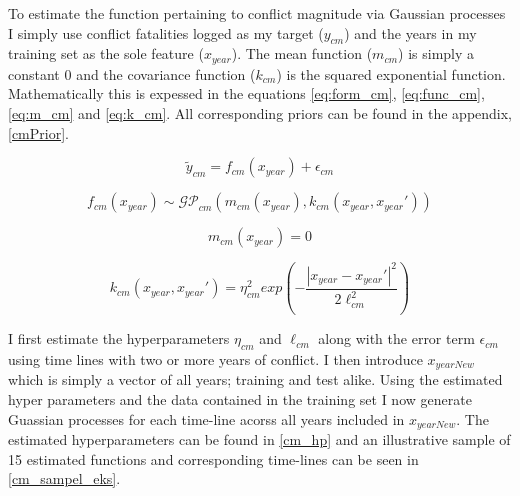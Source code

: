 \documentclass[a4paper]{article}
\begin{document}
To estimate the function pertaining to conflict magnitude via Gaussian processes I simply use conflict fatalities logged as my target ($y_{cm}$) and the years in my training set as the sole feature ($x_{year}$). The mean function ($m_{cm}$) is simply a constant $0$ and the covariance function ($k_{cm}$) is the squared exponential function. Mathematically this is expessed in the equations \ref{eq:form_cm}, \ref{eq:func_cm}, \ref{eq:m_cm} and \ref{eq:k_cm}. All corresponding priors can be found in the appendix, \autoref{cmPrior}.\par

\[
\tilde{y}_{cm} = f_{cm}(x_{year}) + \epsilon_{cm} \tag{19} \label{eq:form_cm}
\]

\[
f_{cm}(x_{year}) \sim \mathcal{GP}_{cm}(m_{cm}(x_{year}),k_{cm}(x_{year},x_{year}')) \tag{20} \label{eq:func_cm}
\]

\[
m_{cm}(x_{year}) = 0 \tag{21} \label{eq:m_cm}
\]

\[
k_{cm}(x_{year},x_{year}') = \eta_{cm}^2 exp\left(-\frac{|x_{year}-x_{year}'|^2}{2\ell_{cm}^2}\right) \tag{22} \label{eq:k_cm}
\]

I first estimate the hyperparameters $\eta_{cm}$ and $\ell_{cm}$ along with the error term $\epsilon_{cm}$ using time lines with two or more years of conflict. I then introduce $x_{yearNew}$ which is simply a vector of all years; training and test alike. Using the estimated hyper parameters and the data contained in the training set I now generate Guassian processes for each time-line acorss all years included in $x_{yearNew}$. The estimated hyperparameters can be found in \autoref{cm_hp} and an illustrative sample of 15 estimated functions and corresponding time-lines can be seen in \autoref{cm_sampel_eks}.
\end{document}
